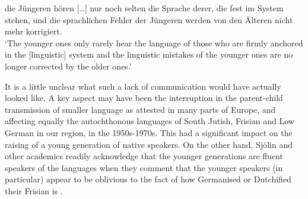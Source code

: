 \documentclass[output=paper]{langsci/langscibook}
\begin{document}
\begin{modquote}
die Jüngeren hören […] nur noch selten die Sprache derer, die fest im System stehen, und die sprachlichen Fehler der Jüngeren werden von den Älteren nicht mehr korrigiert. \citep[470]{Sjolin1997}\smallskip\\\relax
‘The younger ones only rarely hear the language of those who are firmly anchored in the [linguistic] system and the linguistic mistakes of the younger ones are no longer corrected by the older ones.’
\end{modquote}

It is a little unclear what such a lack of communication would have actually looked like. A key aspect may have been the interruption in the parent-child transmission of smaller language as attested in many parts of Europe, and affecting equally the autochthonous languages of South Jutish, Frisian and Low German in our region, in the 1950s-1970s. This had a significant impact on the raising of a young generation of native speakers. On the other hand, Sjölin and other academics readily acknowledge that the younger generations are fluent speakers of the languages when they comment that the younger speakers (in particular) appear to be oblivious to the fact of how Germanised or Dutchified their Frisian is \citep[471]{Sjolin1997}. 
\end{document}
